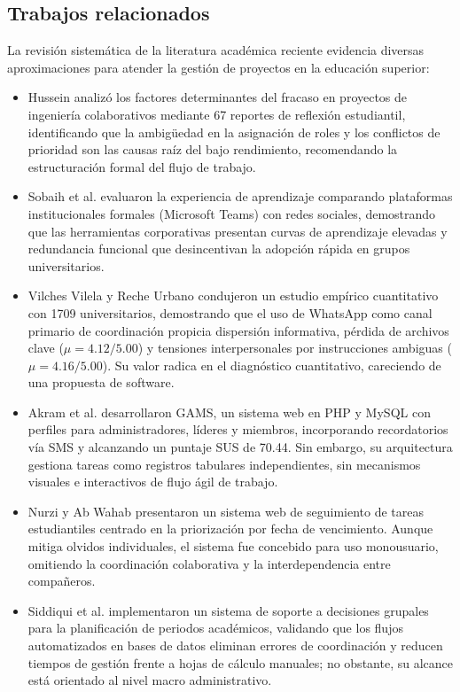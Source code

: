 \documentclass[conference]{IEEEtran}
\begin{document}
\subsection{Trabajos relacionados}
La revisión sistemática de la literatura académica reciente evidencia diversas aproximaciones para atender la gestión de proyectos en la educación superior:
\begin{itemize}
    \item Hussein \cite{hussein2021addressing} analizó los factores determinantes del fracaso en proyectos de ingeniería colaborativos mediante 67 reportes de reflexión estudiantil, identificando que la ambigüedad en la asignación de roles y los conflictos de prioridad son las causas raíz del bajo rendimiento, recomendando la estructuración formal del flujo de trabajo.
    \item Sobaih et al. \cite{sobaih2021responses} evaluaron la experiencia de aprendizaje comparando plataformas institucionales formales (Microsoft Teams) con redes sociales, demostrando que las herramientas corporativas presentan curvas de aprendizaje elevadas y redundancia funcional que desincentivan la adopción rápida en grupos universitarios.
    \item Vilches Vilela y Reche Urbano \cite{vilches2019limitaciones} condujeron un estudio empírico cuantitativo con 1709 universitarios, demostrando que el uso de WhatsApp como canal primario de coordinación propicia dispersión informativa, pérdida de archivos clave ($\mu=4.12/5.00$) y tensiones interpersonales por instrucciones ambiguas ($\mu=4.16/5.00$). Su valor radica en el diagnóstico cuantitativo, careciendo de una propuesta de software.
    \item Akram et al. \cite{akram2024gams} desarrollaron GAMS, un sistema web en PHP y MySQL con perfiles para administradores, líderes y miembros, incorporando recordatorios vía SMS y alcanzando un puntaje SUS de 70.44. Sin embargo, su arquitectura gestiona tareas como registros tabulares independientes, sin mecanismos visuales e interactivos de flujo ágil de trabajo.
    \item Nurzi y Ab Wahab \cite{nurzi2022task} presentaron un sistema web de seguimiento de tareas estudiantiles centrado en la priorización por fecha de vencimiento. Aunque mitiga olvidos individuales, el sistema fue concebido para uso monousuario, omitiendo la coordinación colaborativa y la interdependencia entre compañeros.
    \item Siddiqui et al. \cite{siddiqui2018gdss} implementaron un sistema de soporte a decisiones grupales para la planificación de periodos académicos, validando que los flujos automatizados en bases de datos eliminan errores de coordinación y reducen tiempos de gestión frente a hojas de cálculo manuales; no obstante, su alcance está orientado al nivel macro administrativo.
\end{itemize}
\end{document}
